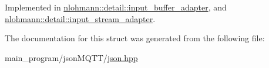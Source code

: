 Implemented in \hyperlink{classnlohmann_1_1detail_1_1input__buffer__adapter_a428d0ad853394233bffb8ceae9871a63}{nlohmann\+::detail\+::input\+\_\+buffer\+\_\+adapter}, and \hyperlink{classnlohmann_1_1detail_1_1input__stream__adapter_ab6a65d3816ce4027ef4d2013a13ee697}{nlohmann\+::detail\+::input\+\_\+stream\+\_\+adapter}.



The documentation for this struct was generated from the following file\+:\begin{DoxyCompactItemize}
\item 
main\+\_\+program/json\+M\+Q\+T\+T/\hyperlink{json_8hpp}{json.\+hpp}\end{DoxyCompactItemize}
